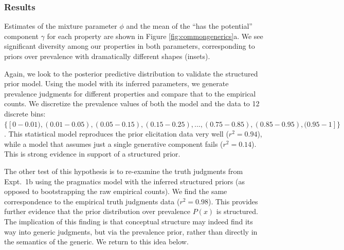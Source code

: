 \documentclass[12pt,letterpaper]{article}
\newcommand{\mht}[1]{\textcolor{Blue}{[mht: #1]}}
\begin{document}
\subsubsection*{Results}


Estimates of the mixture parameter $\phi$ and the mean of the ``has the potential'' component $\gamma$ for each property are shown in Figure \ref{fig:commongenerics}a.
We see significant diversity among our properties in both parameters, corresponding to priors over prevalence with dramatically different shapes (insets). 

Again, we look to the posterior predictive distribution to validate the structured prior model.
Using the model with its inferred parameters, we generate prevalence judgments for different properties and compare that to the empirical counts. 
We discretize the prevalence values of both the model and the data to 12 discrete bins: $\{[0-0.01), (0.01-0.05), (0.05-0.15), (0.15-0.25),  ..., (0.75-0.85), (0.85-0.95), (0.95-1]\}$.
This statistical model reproduces the prior elicitation data very well ($r^2 = 0.94$), while a model that assumes just a single generative component fails ($r^2 = 0.14$). This is strong evidence in support of a structured prior. 


The other test of this hypothesis is to re-examine the truth judgments from Expt.~1b using the pragmatics model with the inferred structured priors (as opposed to bootstrapping the raw empirical counts). 
We find the same correspondence to the empirical truth judgments data ($r^2 = 0.98$).
This provides further evidence that the prior distribution over prevalence $P(x)$ is structured.
The implication of this finding is that conceptual structure may indeed find its way into generic judgments, but via the prevalence prior, rather than directly in the semantics of the generic. We return to this idea below.

\end{document}
